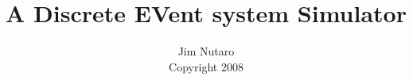 \documentclass{book}
\author{Jim Nutaro \\ Copyright 2008}
\title{A Discrete EVent system Simulator}
\date{}
\begin{document}
    \frontmatter
	\maketitle
	\begin{latexonly}
	\tableofcontents
	\end{latexonly}
    \mainmatter
	
                 
	
	
	
	
	
	
	
	
\end{document}
